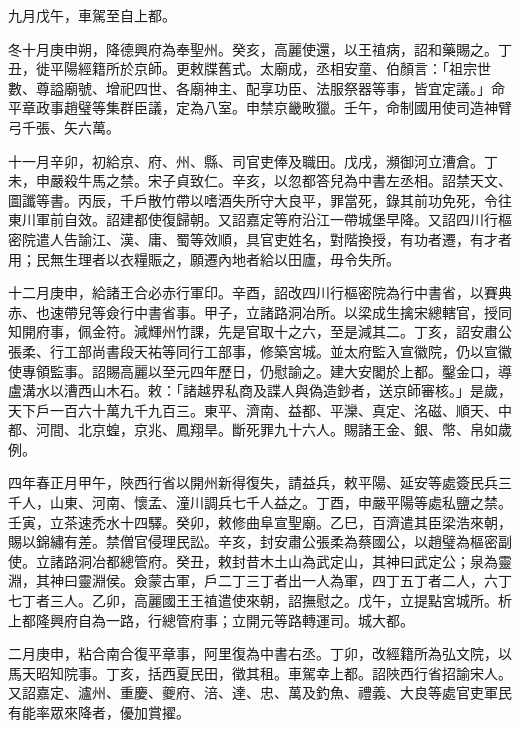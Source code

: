 \begin{pinyinscope}
 九月戊午，車駕至自上都。



 冬十月庚申朔，降德興府為奉聖州。癸亥，高麗使還，以王禃病，詔和藥賜之。丁丑，徙平陽經籍所於京師。更敕牒舊式。太廟成，丞相安童、伯顏言：「祖宗世數、尊謚廟號、增祀四世、各廟神主、配享功臣、法服祭器等事，皆宜定議。」命平章政事趙璧等集群臣議，定為八室。申禁京畿畋獵。壬午，命制國用使司造神臂弓千張、矢六萬。



 十一月辛卯，初給京、府、州、縣、司官吏俸及職田。戊戌，瀕御河立漕倉。丁未，申嚴殺牛馬之禁。宋子貞致仁。辛亥，以忽都答兒為中書左丞相。詔禁天文、圖讖等書。丙辰，千戶散竹帶以嗜酒失所守大良平，罪當死，錄其前功免死，令往東川軍前自效。詔建都使復歸朝。又詔嘉定等府沿江一帶城堡早降。又詔四川行樞密院遣人告諭江、漢、庸、蜀等效順，具官吏姓名，對階換授，有功者遷，有才者用；民無生理者以衣糧賑之，願遷內地者給以田廬，毋令失所。



 十二月庚申，給諸王合必赤行軍印。辛酉，詔改四川行樞密院為行中書省，以賽典赤、也速帶兒等僉行中書省事。甲子，立諸路洞冶所。以梁成生擒宋總轄官，授同知開府事，佩金符。減輝州竹課，先是官取十之六，至是減其二。丁亥，詔安肅公張柔、行工部尚書段天祐等同行工部事，修築宮城。並太府監入宣徽院，仍以宣徽使專領監事。詔賜高麗以至元四年歷日，仍慰諭之。建大安閣於上都。鑿金口，導盧溝水以漕西山木石。敕：「諸越界私商及諜人與偽造鈔者，送京師審核。」是歲，天下戶一百六十萬九千九百三。東平、濟南、益都、平灤、真定、洺磁、順天、中都、河間、北京蝗，京兆、鳳翔旱。斷死罪九十六人。賜諸王金、銀、幣、帛如歲例。



 四年春正月甲午，陜西行省以開州新得復失，請益兵，敕平陽、延安等處簽民兵三千人，山東、河南、懷孟、潼川調兵七千人益之。丁酉，申嚴平陽等處私鹽之禁。壬寅，立茶速禿水十四驛。癸卯，敕修曲阜宣聖廟。乙巳，百濟遣其臣梁浩來朝，賜以錦繡有差。禁僧官侵理民訟。辛亥，封安肅公張柔為蔡國公，以趙璧為樞密副使。立諸路洞冶都總管府。癸丑，敕封昔木土山為武定山，其神曰武定公；泉為靈淵，其神曰靈淵侯。僉蒙古軍，戶二丁三丁者出一人為軍，四丁五丁者二人，六丁七丁者三人。乙卯，高麗國王王禃遣使來朝，詔撫慰之。戊午，立提點宮城所。析上都隆興府自為一路，行總管府事；立開元等路轉運司。城大都。



 二月庚申，粘合南合復平章事，阿里復為中書右丞。丁卯，改經籍所為弘文院，以馬天昭知院事。丁亥，括西夏民田，徵其租。車駕幸上都。詔陜西行省招諭宋人。又詔嘉定、瀘州、重慶、夔府、涪、達、忠、萬及釣魚、禮義、大良等處官吏軍民有能率眾來降者，優加賞擢。




\end{pinyinscope}
